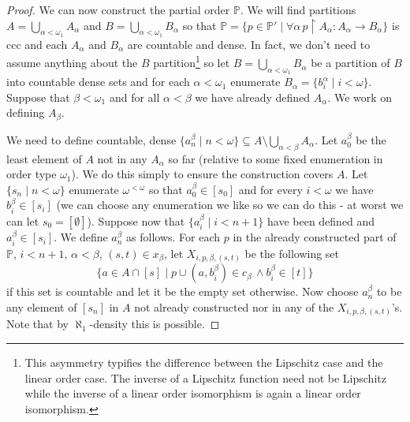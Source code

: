 \documentclass[leqno,11pt]{amsart}
\theoremstyle{definition}
\theoremstyle{remark}
\def\hook{\upharpoonright}
\def\P{\mathbb P}
\begin{document}
\begin{proof}
    We can now construct the partial order $\P$. We will find partitions $A = \bigcup_{\alpha < \omega_1} A_\alpha$ and $B = \bigcup_{\alpha < \omega_1} B_\alpha$ so that $\P = \{p \in \P' \; | \; \forall \alpha \, p\hook A_\alpha:A_\alpha \to B_\alpha\}$ is ccc and each $A_\alpha$ and $B_\alpha$ are countable and dense. In fact, we don't need to assume anything about the $B$ partition\footnote{This asymmetry typifies the difference between the Lipschitz case and the linear order case. The inverse of a Lipschitz function need not be Lipschitz while the inverse of a linear order isomorphism is again a linear order isomorphism.} so let $B = \bigcup_{\alpha < \omega_1} B_\alpha$ be a partition of $B$ into countable dense sets and for each $\alpha < \omega_1$ enumerate $B_\alpha = \{b^\alpha_i\; | \; i < \omega\}$. Suppose that $\beta < \omega_1$ and for all $\alpha < \beta$ we have already defined $A_\alpha$. We work on defining $A_\beta$. 

We need to define countable, dense $\{a^\beta_n\; | \; n < \omega\} \subseteq A \setminus \bigcup_{\alpha < \beta} A_\alpha$. Let $a^\beta_0$ be the least element of $A$ not in any $A_\alpha$ so far (relative to some fixed enumeration in order type $\omega_1$). We do this simply to ensure the construction covers $A$. Let $\{s_n\; | \; n < \omega\}$ enumerate $\omega^{<\omega}$ so that $a^\beta_0 \in [s_0]$ and for every $i < \omega$ we have $b^\beta_i \in [s_i]$ (we can choose any enumeration we like so we can do this - at worst we can let $s_0 = [\emptyset]$). Suppose now that $\{a^\beta_i\; | \; i<n + 1\}$ have been defined and $a_i^\beta \in [s_i]$. We define $a^\beta_n$ as follows. For each $p$ in the already constructed part of $\P$, $i < n+1$, $\alpha < \beta$, $(s, t) \in x_\beta$, let $X_{i, p, \beta, (s, t)}$ be the following set $$\{a \in A \cap [s]\; | \; p \cup (a, b^\beta_i) \in c_\beta \, \land b^\beta_i \in [t]\}$$ if this set is countable and let it be the empty set otherwise. Now choose $a^\beta_n$ to be any element of $[s_n]$ in $A$ not already constructed nor in any of the $X_{i, p, \beta, (s, t)}$'s. Note that by $\aleph_1$-density this is possible.


\end{proof}
\end{document}
